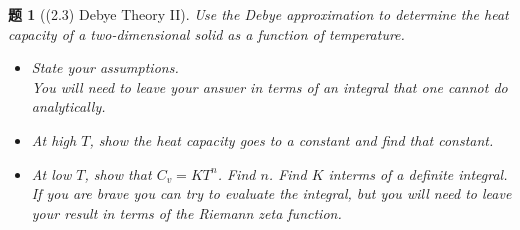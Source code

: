 \documentclass[UTF8,10pt,a4paper]{article}
\theoremstyle{Problem}
\newtheorem{prob}{题}
\theoremstyle{Solution}
\begin{document}
\thispagestyle{FirstPageStyle}
\begin{prob}[(2.3) Debye Theory II]
    Use the Debye approximation to determine the heat capacity of a two-dimensional solid as a function of temperature.
    \begin{itemize}
        \item[$\triangleright$] State your assumptions.\\
        You will need to leave your answer in terms of an integral that one cannot do analytically.
        \item[$\triangleright$] At high $T$, show the heat capacity goes to a constant and find that constant.
        \item[$\triangleright$] At low $T$, show that $C_v=KT^n$. Find $n$. Find $K$ interms of a definite integral.\\
        If you are brave you can try to evaluate the integral, but you will need to leave your result in terms of the Riemann zeta function.
    \end{itemize}
\end{prob}
\end{document}
